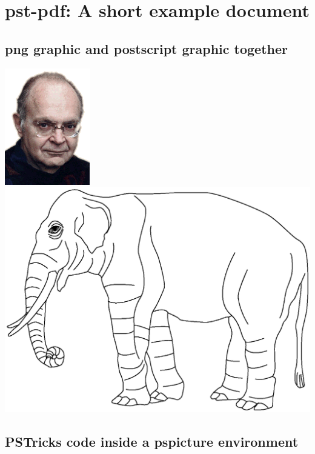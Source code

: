 \documentclass[12pt,a4paper]{article}
\begin{document}
\section*{\textsf{pst-pdf:} A short example document}

\subsection*{png graphic and postscript graphic together}

\noindent\includegraphics[width=.35\textwidth]{knuth}%
\hfill
\includegraphics[width=.60\textwidth]{elephant}%

\subsection*{PSTricks code inside a pspicture environment}

\end{document}
